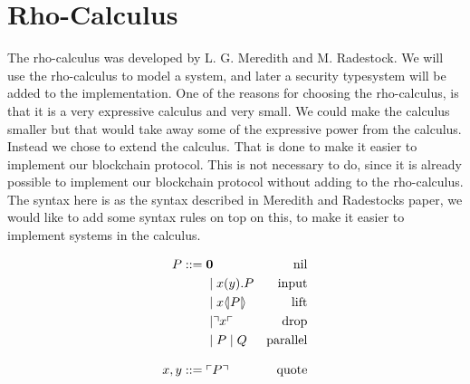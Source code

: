 \section{Rho-Calculus}\label{ch:rho-calculus}



The rho-calculus was developed by L. G. Meredith and M. Radestock\citep{Meredith2005}. We will use the rho-calculus to model a system, and later a security typesystem will be added to the implementation. One of the reasons for choosing the rho-calculus, is that it is a very expressive calculus and very small. We could make the calculus smaller but that would take away some of the expressive power from the calculus. Instead we chose to extend the calculus. That is done to make it easier to implement our blockchain protocol. This is not necessary to do, since it is already possible to implement our blockchain protocol without adding to the rho-calculus.\\
The syntax here is as the syntax described in Meredith and Radestocks paper\citep{Meredith2005}, we would like to add some syntax rules on top on this, to make it easier to implement systems in the calculus.

\begin{align*}
    P  ::= \; &  \mathbf{0} & \text{nil} \\
      & \mid x(y).P & \text{input} \\
      & \mid x \langle \! | P | \! \rangle & \text{lift} \\
      & \mid \urcorner x \ulcorner & \text{drop} \\
      & \mid P \mid Q & \text{parallel} \\[3mm]
    x,y ::= \; & \ulcorner P \urcorner & \text{quote}\\
\end{align*}

